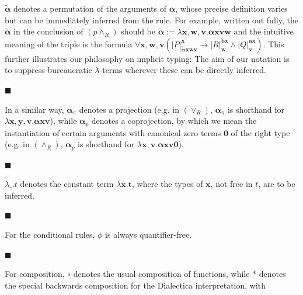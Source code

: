 $\tilde{\bm{\alpha}}$ denotes a permutation of the arguments of $\bm{\alpha}$, whose precise definition varies but can be immediately inferred from the rule. For example, written out fully, the $\tilde{\bm{\alpha}}$ in the conclusion of $(p\wedge_{R})$ should be $\tilde{\bm{\alpha}}:=\lambda\bm{x},\bm{w},\bm{v}.\bm{\alpha}\bm{x}\bm{v}\bm{w}$ and the intuitive meaning of the triple is the formula $\forall\bm{x},\bm{w},\bm{v}\left(|{P}|^{\bm{x}}_{\tilde{\bm{\alpha}}\bm{x}\bm{w}\bm{v}}\to|{R}|^{\bm{b}\bm{x}}_{\bm{w}}\wedge|{Q}|^{\bm{a}\bm{x}}_{\bm{v}}\right)$. This further illustrates our philosophy on implicit typing: The aim of our notation is to suppress bureaucratic $\lambda$-terms wherever these can be directly inferred.\par
 
 
 
\par\noindent  $\blacksquare$ 
 
In a similar way, $\bm{\alpha}_{\pi}$ denotes a projection (e.g. in $(\vee_{R})$, $\bm{\alpha}_{\pi}$ is shorthand for $\lambda\bm{x},\bm{y},\bm{v}.\bm{\alpha}\bm{x}\bm{v}$), while $\bm{\alpha}_{p}$ denotes a coprojection, by which we mean the instantiation of certain arguments with canonical zero terms $\bm{0}$ of the right type (e.g. in $(\wedge_{R})$, $\bm{\alpha}_{p}$ is shorthand for $\lambda\bm{x},\bm{v}.\bm{\alpha}\bm{x}\bm{v}\bm{0}$).\par
 
 
 
\par\noindent  $\blacksquare$ 
 
$\lambda\_.t$ denotes the constant term $\lambda\bm{x}.\bm{t}$, where the types of $\bm{x}$, not free in $t$, are to be inferred.\par
 
 
 
\par\noindent  $\blacksquare$ 
 
For the conditional rules, $\phi$ is always quantifier-free.\par
 
 
 
\par\noindent  $\blacksquare$ 
 
For composition, $\circ$ denotes the usual composition of functions, while $\ast$ denotes the special backwards composition for the Dialectica interpretation, with\par
  
